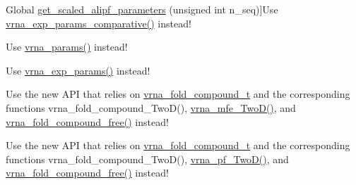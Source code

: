 \begin{DoxyRefList}
\hypertarget{deprecated__deprecated000088}{}%
Global \hyperlink{group__energy__parameters_ga0ccf4e1be085a573533fd6b9da2d8cf9}{get\-\_\-scaled\-\_\-alipf\-\_\-parameters} (unsigned int n\-\_\-seq)]Use \hyperlink{group__energy__parameters_gaf78c09e685e6eef4100b1a41d4042550}{vrna\-\_\-exp\-\_\-params\-\_\-comparative()} instead! 
\item[\label{deprecated__deprecated000091}%
\hypertarget{deprecated__deprecated000091}{}%
Global \hyperlink{group__energy__parameters_ga7fa6a000d7c16feab939f2c4ee626197}{get\-\_\-scaled\-\_\-parameters} (double temperature, vrna\-\_\-md\-\_\-t md)]Use \hyperlink{group__energy__parameters_gad0e3e7e74bdc50d1709d40c92993185e}{vrna\-\_\-params()} instead! 
\item[\label{deprecated__deprecated000085}%
\hypertarget{deprecated__deprecated000085}{}%
Global \hyperlink{group__energy__parameters_gabf3b9271c41dd3fac02d56e0b02b3344}{get\-\_\-scaled\-\_\-pf\-\_\-parameters} (void)]Use \hyperlink{group__energy__parameters_gab1f3016f96aa96bff020cdd904605afa}{vrna\-\_\-exp\-\_\-params()} instead! 
\item[\label{deprecated__deprecated000002}%
\hypertarget{deprecated__deprecated000002}{}%
Global \hyperlink{group__kl__neighborhood__mfe_gac9284f132cf0eaa0a2f43590eda05488}{get\-\_\-\-Two\-Dfold\-\_\-variables} (const char $\ast$seq, const char $\ast$structure1, const char $\ast$structure2, int circ)]Use the new A\-P\-I that relies on \hyperlink{group__fold__compound_ga1b0cef17fd40466cef5968eaeeff6166}{vrna\-\_\-fold\-\_\-compound\-\_\-t} and the corresponding functions vrna\-\_\-fold\-\_\-compound\-\_\-\-Two\-D(), \hyperlink{group__kl__neighborhood__mfe_ga243c288b463147352829df04de6a2f77}{vrna\-\_\-mfe\-\_\-\-Two\-D()}, and \hyperlink{group__fold__compound_gadded6039d63f5d6509836e20321534ad}{vrna\-\_\-fold\-\_\-compound\-\_\-free()} instead! 
\item[\label{deprecated__deprecated000007}%
\hypertarget{deprecated__deprecated000007}{}%
Global \hyperlink{2Dpfold_8h_a1aca740e2a75ab2b2951538266e53d64}{get\-\_\-\-Two\-Dpfold\-\_\-variables} (const char $\ast$seq, const char $\ast$structure1, char $\ast$structure2, int circ)]Use the new A\-P\-I that relies on \hyperlink{group__fold__compound_ga1b0cef17fd40466cef5968eaeeff6166}{vrna\-\_\-fold\-\_\-compound\-\_\-t} and the corresponding functions vrna\-\_\-fold\-\_\-compound\-\_\-\-Two\-D(), \hyperlink{group__kl__neighborhood__pf_ga0bc3427689bd09da09b8b3094a27f836}{vrna\-\_\-pf\-\_\-\-Two\-D()}, and \hyperlink{group__fold__compound_gadded6039d63f5d6509836e20321534ad}{vrna\-\_\-fold\-\_\-compound\-\_\-free()} instead! 

\end{DoxyRefList}
